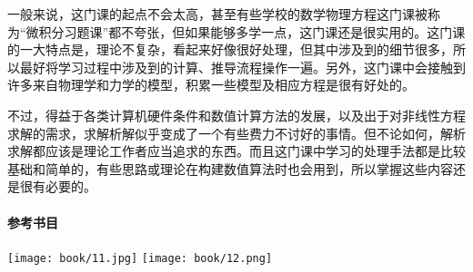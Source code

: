 一般来说，这门课的起点不会太高，甚至有些学校的数学物理方程这门课被称为“微积分习题课”都不夸张，但如果能够多学一点，这门课还是很实用的。这门课的一大特点是，理论不复杂，看起来好像很好处理，但其中涉及到的细节很多，所以最好将学习过程中涉及到的计算、推导流程操作一遍。另外，这门课中会接触到许多来自物理学和力学的模型，积累一些模型及相应方程是很有好处的。

不过，得益于各类计算机硬件条件和数值计算方法的发展，以及出于对非线性方程求解的需求，求解析解似乎变成了一个有些费力不讨好的事情。但不论如何，解析求解都应该是理论工作者应当追求的东西。而且这门课中学习的处理手法都是比较基础和简单的，有些思路或理论在构建数值算法时也会用到，所以掌握这些内容还是很有必要的。

\paragraph{参考书目}

\begin{center}
    \texttt{[image: book/11.jpg]} \quad
    \texttt{[image: book/12.png]}
\end{center}

